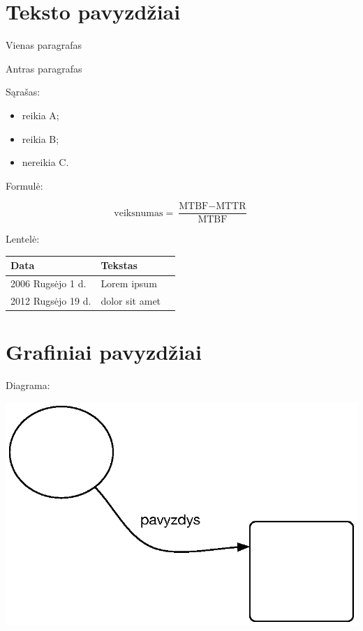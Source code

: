 
\section{Teksto pavyzdžiai}

\par Vienas paragrafas

\par Antras paragrafas

\par Sąrašas:

\begin{itemize}
  \item reikia A;
  \item reikia B;
  \item nereikia C.
\end{itemize}

\par Formulė:

\par \begin{equation}
  \text{veiksnumas} = \frac{\text{MTBF} - \text{MTTR}}{\text{MTBF}}
\end{equation}

\par Lentelė:

\begingroup
\fontsize{12pt}{14pt}\selectfont
\begin{tabularx}{0.93\textwidth}{ l l p{6.5cm} }
  Data  & Tekstas \\
  \hline
  2006 Rugsėjo 1 d. & Lorem ipsum \\
  \hline
  2012 Rugsėjo 19 d. & dolor sit amet \\
  \hline
\end{tabularx}
\endgroup
\vskip 1cm


\section{Grafiniai pavyzdžiai}

\par Diagrama:

\includegraphics[angle=0,scale=0.75]{assets/diagram.eps}

